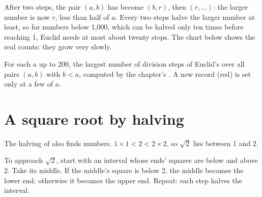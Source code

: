 After two steps, the pair $(a, b)$ has become $(b, r)$, then $(r, \ldots)$:
the larger number is now $r$, less than half of $a$. Every two steps halve the
larger number at least, so for numbers below 1,000, which can be halved only
ten times before reaching 1, Euclid needs at most about twenty steps. The
chart below shows the real counts: they grow very slowly.

\begin{omfigure}

{\small For each $a$ up to 200, the largest number of division steps of Euclid's
 over all pairs $(a, b)$ with $b < a$, computed by the chapter's
. A new record (red) is set only at a few  of $a$.}
\end{omfigure}

\section{A square root by halving}

The halving of  also finds numbers. $1 \times 1 < 2 < 2 \times 2$,
so $\sqrt{2}$ lies between 1 and 2.

\begin{method}\label{met:g9:algorithms-on-numbers:sqrt-halving}
To approach $\sqrt{2}$, start with an interval whose ends' squares are below
and above 2. Take its middle. If the middle's square is below 2, the middle
becomes the lower end; otherwise it becomes the upper end. Repeat: each step
halves the interval.
\end{method}

